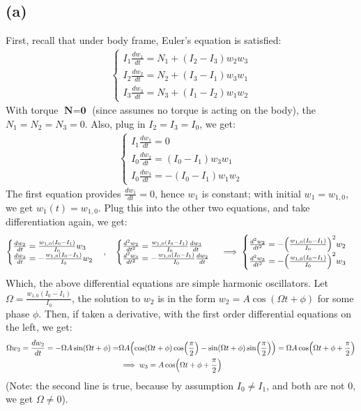 \documentclass{article}
\DeclarePairedDelimiter{\paran}{(}{)}%
\newcommand{\bN}{\textbf{N}} %
\newcommand{\bzero}{\textbf{0}}
\begin{document}
\subsection*{(a)}
First, recall that under body frame, Euler's equation is satisfied:
\begin{align}
    \begin{cases}
        I_1\frac{dw_1}{dt}=N_1+(I_2-I_3)w_2w_3\\
        I_2\frac{dw_2}{dt}=N_2+(I_3-I_1)w_3w_1\\
        I_3\frac{dw_3}{dt}=N_3+(I_1-I_2)w_1w_2
    \end{cases}
\end{align}
With torque $\bN=\bzero$ (since assumes no torque is acting on the body), the $N_1=N_2=N_3=0$. Also, plug in $I_2=I_3 = I_0$, we get:
\begin{align}
    \begin{cases}
        I_1\frac{dw_1}{dt}=0\\
        I_0\frac{dw_2}{dt}=(I_0-I_1)w_3w_1\\
        I_0\frac{dw_3}{dt}=-(I_0-I_1)w_1w_2
    \end{cases}
\end{align}
The first equation provides $\frac{dw_1}{dt}=0$, hence $w_1$ is constant; with initial $w_1=w_{1,0}$, we get $w_1(t) = w_{1,0}$. Plug this into the other two equations, and take differentiation again, we get:
\begin{align}
    \begin{cases}
        \frac{dw_2}{dt}=\frac{w_{1,0}(I_0-I_1)}{I_0}w_3\\
        \frac{dw_3}{dt}=-\frac{w_{1,0}(I_0-I_1)}{I_0}w_2
    \end{cases}, \quad \begin{cases}
        \frac{d^2w_2}{dt^2} = \frac{w_{1,0}(I_0-I_1)}{I_0}\frac{dw_3}{dt}\\
        \frac{d^2w_3}{dt^2}=-\frac{w_{1,0}(I_0-I_1)}{I_0}\frac{dw_2}{dt}
    \end{cases}\implies \begin{cases}
        \frac{d^2w_2}{dt^2} = -\paran*{\frac{w_{1,0}(I_0-I_1)}{I_0}}^2w_2\\
        \frac{d^2w_3}{dt^2}=-\paran*{\frac{w_{1,0}(I_0-I_1)}{I_0}}^2w_3
    \end{cases}
\end{align}
Which, the above differential equations are simple harmonic oscillators. Let $\Omega = \frac{w_{1,0}(I_0-I_1)}{I_0}$, the solution to $w_2$ is in the form $w_2=A\cos(\Omega t+\phi)$ for some phase $\phi$. Then, if taken a derivative, with the first order differential equations on the left, we get:
\begin{align}
    \Omega w_3 = \frac{dw_2}{dt} = -\Omega A\sin(\Omega t+\phi) = &\Omega A\paran*{\cos(\Omega t+\phi)\cos\paran*{\frac{\pi}{2}}-\sin(\Omega t+\phi)\sin\paran*{\frac{\pi}{2}}} = \Omega A\cos\paran*{\Omega t+\phi + \frac{\pi}{2}}\\
    &\implies w_3 = A\cos\paran*{\Omega t+\phi + \frac{\pi}{2}}
\end{align}
(Note: the second line is true, because by assumption $I_0\neq I_1$, and both are not $0$, we get $\Omega\neq 0$).
\end{document}
